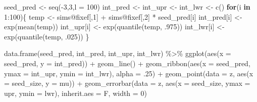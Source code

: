 \documentclass[
  letterpaper,
  DIV=11,
  numbers=noendperiod]{scrartcl}
\newenvironment{Shaded}{\begin{snugshade}}{\end{snugshade}}
\newcommand{\AttributeTok}[1]{\textcolor[rgb]{0.40,0.45,0.13}{#1}}
\newcommand{\ControlFlowTok}[1]{\textcolor[rgb]{0.00,0.23,0.31}{\textbf{#1}}}
\newcommand{\DecValTok}[1]{\textcolor[rgb]{0.68,0.00,0.00}{#1}}
\newcommand{\FunctionTok}[1]{\textcolor[rgb]{0.28,0.35,0.67}{#1}}
\newcommand{\NormalTok}[1]{\textcolor[rgb]{0.00,0.23,0.31}{#1}}
\newcommand{\OtherTok}[1]{\textcolor[rgb]{0.00,0.23,0.31}{#1}}
\newcommand{\SpecialCharTok}[1]{\textcolor[rgb]{0.37,0.37,0.37}{#1}}
\begin{document}
\begin{Shaded}
\begin{Highlighting}[]
\NormalTok{seed\_pred }\OtherTok{\textless{}{-}} \FunctionTok{seq}\NormalTok{(}\SpecialCharTok{{-}}\DecValTok{3}\NormalTok{,}\DecValTok{3}\NormalTok{,}\AttributeTok{l =} \DecValTok{100}\NormalTok{)}
\NormalTok{int\_pred }\OtherTok{\textless{}{-}}\NormalTok{ int\_upr }\OtherTok{\textless{}{-}}\NormalTok{ int\_lwr }\OtherTok{\textless{}{-}} \FunctionTok{c}\NormalTok{()}
\ControlFlowTok{for}\NormalTok{(i }\ControlFlowTok{in} \DecValTok{1}\SpecialCharTok{:}\DecValTok{100}\NormalTok{)\{}
\NormalTok{  temp }\OtherTok{\textless{}{-}}\NormalTok{ sims}\SpecialCharTok{@}\NormalTok{fixef[,}\DecValTok{1}\NormalTok{] }\SpecialCharTok{+}\NormalTok{ sims}\SpecialCharTok{@}\NormalTok{fixef[,}\DecValTok{2}\NormalTok{] }\SpecialCharTok{*}\NormalTok{ seed\_pred[i]}
\NormalTok{  int\_pred[i] }\OtherTok{\textless{}{-}} \FunctionTok{exp}\NormalTok{(}\FunctionTok{mean}\NormalTok{(temp))}
\NormalTok{  int\_upr[i] }\OtherTok{\textless{}{-}} \FunctionTok{exp}\NormalTok{(}\FunctionTok{quantile}\NormalTok{(temp, .}\DecValTok{975}\NormalTok{))}
\NormalTok{  int\_lwr[i] }\OtherTok{\textless{}{-}} \FunctionTok{exp}\NormalTok{(}\FunctionTok{quantile}\NormalTok{(temp, .}\DecValTok{025}\NormalTok{))}
\NormalTok{\}}

\FunctionTok{data.frame}\NormalTok{(seed\_pred, int\_pred, int\_upr, int\_lwr) }\SpecialCharTok{\%\textgreater{}\%} 
  \FunctionTok{ggplot}\NormalTok{(}\FunctionTok{aes}\NormalTok{(}\AttributeTok{x =}\NormalTok{ seed\_pred, }\AttributeTok{y =}\NormalTok{ int\_pred)) }\SpecialCharTok{+}
  \FunctionTok{geom\_line}\NormalTok{() }\SpecialCharTok{+}
  \FunctionTok{geom\_ribbon}\NormalTok{(}\FunctionTok{aes}\NormalTok{(}\AttributeTok{x =}\NormalTok{ seed\_pred, }\AttributeTok{ymax =}\NormalTok{ int\_upr, }\AttributeTok{ymin =}\NormalTok{ int\_lwr), }\AttributeTok{alpha =}\NormalTok{ .}\DecValTok{25}\NormalTok{) }\SpecialCharTok{+}
  \FunctionTok{geom\_point}\NormalTok{(}\AttributeTok{data =}\NormalTok{ z, }\FunctionTok{aes}\NormalTok{(}\AttributeTok{x =}\NormalTok{ seed\_size, }\AttributeTok{y =}\NormalTok{ mu)) }\SpecialCharTok{+}
  \FunctionTok{geom\_errorbar}\NormalTok{(}\AttributeTok{data =}\NormalTok{ z, }\FunctionTok{aes}\NormalTok{(}\AttributeTok{x =}\NormalTok{ seed\_size, }\AttributeTok{ymax =}\NormalTok{ upr, }\AttributeTok{ymin =}\NormalTok{ lwr), }\AttributeTok{inherit.aes =}\NormalTok{ F,}
                \AttributeTok{width =} \DecValTok{0}\NormalTok{)}
\end{Highlighting}
\end{Shaded}
\end{document}
